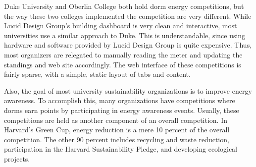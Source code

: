 % 
% 
% 

Duke University and Oberlin College both hold dorm energy competitions, but the way these two colleges implemented the competition are very different.  While Lucid Design Group's building dashboard is very clean and interactive, most universities use a similar approach to Duke.  This is understandable, since using hardware and software provided by Lucid Design Group is quite expensive.  Thus, most organizers are relegated to manually reading the meter and updating the standings and web site accordingly.  The web interface of these competitions is fairly sparse, with a simple, static layout of tabs and content.

Also, the goal of most university sustainability organizations is to improve energy awareness.  To accomplish this, many organizations have competitions where dorms earn points by participating in energy awareness events.  Usually, these competitions are held as another component of an overall competition. In Harvard's Green Cup\cite{harvard-greencup}, energy reduction is a mere 10 percent of the overall competition. The other 90 percent includes recycling and waste reduction, participation in the Harvard Sustainability Pledge, and developing ecological projects.

